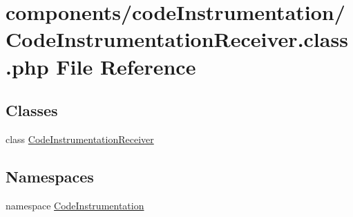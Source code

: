 \hypertarget{_code_instrumentation_receiver_8class_8php}{
\section{components/codeInstrumentation/CodeInstrumentationReceiver.class.php File Reference}
\label{_code_instrumentation_receiver_8class_8php}
}
\subsection*{Classes}
\begin{CompactItemize}
\item 
class \hyperlink{class_code_instrumentation_receiver}{CodeInstrumentationReceiver}
\end{CompactItemize}
\subsection*{Namespaces}
\begin{CompactItemize}
\item 
namespace \hyperlink{namespace_code_instrumentation}{CodeInstrumentation}
\end{CompactItemize}
